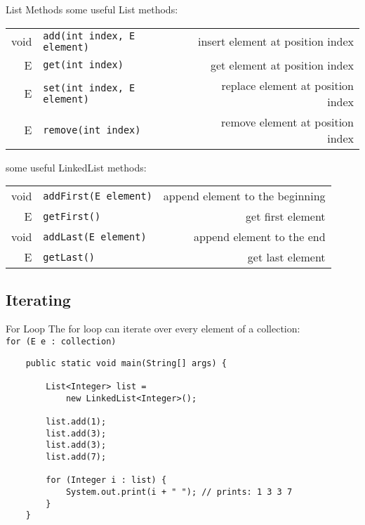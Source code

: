 \begin{frame}[fragile]{List Methods}
    some useful List methods:\\
    \vspace{1em}
    \begin{tabular}{ r l r }
        void & \texttt{add(int index, E element)}
        & \footnotesize{insert element at position index} \\
        E &\texttt{get(int index)}
        & \footnotesize{get element at position index} \\
        E &\texttt{set(int index, E element)}
        & \footnotesize{replace element at position index} \\
        E &\texttt{remove(int index)}
        & \footnotesize{remove element at position index}
    \end{tabular}
    \vfill
    some useful LinkedList methods:\\
    \vspace{1em}
    \begin{tabular}{ r l r }
        void & \texttt{addFirst(E element)}
        & \footnotesize{append element to the beginning} \\
        E & \texttt{getFirst()}
        & \footnotesize{get first element} \\
        void & \texttt{addLast(E element)}
        & \footnotesize{append element to the end} \\
        E & \texttt{getLast()}
        & \footnotesize{get last element}
    \end{tabular}
\end{frame}

\subsection{Iterating}
\begin{frame}[fragile]{For Loop}
    The for loop can iterate over every element of a collection:\\
    \hspace{1em}\texttt{for (E e : collection)}
    \begin{lstlisting}
    public static void main(String[] args) {
    
        List<Integer> list = 
            new LinkedList<Integer>();
        
        list.add(1);
        list.add(3);
        list.add(3);
        list.add(7);
        
        for (Integer i : list) {
            System.out.print(i + " "); // prints: 1 3 3 7
        }
    }
    \end{lstlisting}
\end{frame}

